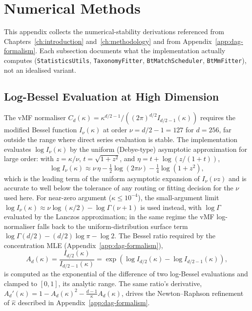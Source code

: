 \chapter{Numerical Methods}\label{app:numerics}

This appendix collects the numerical-stability derivations referenced
from Chapters~\ref{ch:introduction} and~\ref{ch:methodology} and from
Appendix~\ref{app:dag-formalism}.
Each subsection documents what the implementation actually computes
(\texttt{StatisticsUtils}, \texttt{TaxonomyFitter},
\texttt{BtMatchScheduler}, \texttt{BtMmFitter}), not an idealised
variant.

\section{Log-Bessel Evaluation at High Dimension}\label{sec:num-bessel}

The vMF normaliser $C_d(\kappa) = \kappa^{d/2-1} / \left((2\pi)^{d/2}
I_{d/2-1}(\kappa)\right)$ requires the modified Bessel function
$I_\nu(\kappa)$ at order $\nu = d/2 - 1 = 127$ for $d = 256$, far
outside the range where direct series evaluation is stable.
The implementation evaluates $\log I_\nu(\kappa)$ by the uniform
(Debye-type) asymptotic approximation for large order: with
$z = \kappa / \nu$, $t = \sqrt{1 + z^2}$, and
$\eta = t + \log\!\left(z / (1 + t)\right)$,
\[
\log I_\nu(\kappa)
\approx \nu\,\eta
- \tfrac{1}{2}\log\!\left(2\pi\nu\right)
- \tfrac{1}{4}\log\!\left(1 + z^2\right),
\]
which is the leading term of the uniform asymptotic expansion of
$I_\nu(\nu z)$ and is accurate to well below the tolerance of any
routing or fitting decision for the $\nu$ used here.
For near-zero argument ($\kappa \leq 10^{-4}$), the small-argument
limit $\log I_\nu(\kappa) \approx \nu \log(\kappa/2) -
\log\Gamma(\nu + 1)$ is used instead, with $\log\Gamma$ evaluated by
the Lanczos approximation; in the same regime the vMF log-normaliser
falls back to the uniform-distribution surface term
$\log\Gamma(d/2) - (d/2)\log\pi - \log 2$.
The Bessel ratio required by the concentration MLE
(Appendix~\ref{app:dag-formalism}),
\[
A_d(\kappa) = \frac{I_{d/2}(\kappa)}{I_{d/2-1}(\kappa)}
= \exp\!\left(\log I_{d/2}(\kappa) - \log I_{d/2-1}(\kappa)\right),
\]
is computed as the exponential of the difference of two log-Bessel
evaluations and clamped to $[0, 1]$, its analytic range.
The same ratio's derivative,
$A_d'(\kappa) = 1 - A_d(\kappa)^2 - \tfrac{d-1}{\kappa} A_d(\kappa)$,
drives the Newton--Raphson refinement of
$\hat{\kappa}$ described in Appendix~\ref{app:dag-formalism}.

